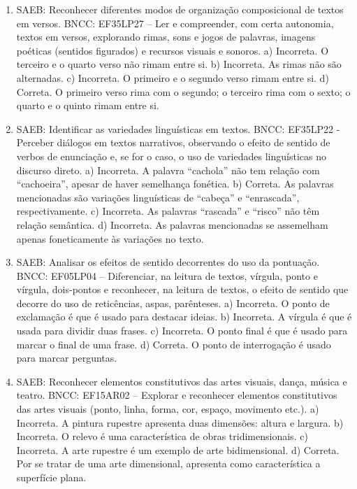\begin{enumerate}
\item
SAEB: Reconhecer diferentes modos de organização composicional de textos em versos.
BNCC: EF35LP27 – Ler e compreender, com certa autonomia,
textos em versos, explorando rimas, sons e jogos de palavras, imagens
poéticas (sentidos figurados) e recursos visuais e sonoros.
a) Incorreta. O terceiro e o quarto verso não rimam entre si.
b) Incorreta. As rimas não são alternadas.
c) Incorreta. O primeiro e o segundo verso rimam entre si.
d) Correta. O primeiro verso rima com o segundo; o terceiro rima com o sexto; o quarto e o quinto rimam entre si.

\item
SAEB: Identificar as variedades linguísticas em textos. BNCC: EF35LP22
- Perceber diálogos em textos narrativos, observando o efeito de sentido
de verbos de enunciação e, se for o caso, o uso de variedades
linguísticas no discurso direto.
a) Incorreta. A palavra “cachola” não tem relação com “cachoeira”, apesar de haver semelhança fonética.
b) Correta. As palavras mencionadas são variações linguísticas de “cabeça” e “enrascada”, respectivamente.
c) Incorreta. As palavras “rascada” e “risco” não têm relação semântica.
d) Incorreta. As palavras mencionadas se assemelham apenas foneticamente às variações no texto.

\item
SAEB: Analisar os efeitos de sentido decorrentes do uso da pontuação.
BNCC: EF05LP04 – Diferenciar, na leitura de textos, vírgula, ponto e
vírgula, dois-pontos e reconhecer, na leitura de textos, o efeito de
sentido que decorre do uso de reticências, aspas, parênteses.
a) Incorreta. O ponto de exclamação é que é usado para destacar ideias.
b) Incorreta. A vírgula é que é usada para dividir duas frases.
c) Incorreta. O ponto final é que é usado para marcar o final de uma frase.
d) Correta. O ponto de interrogação é usado para marcar perguntas.

\item
SAEB: Reconhecer elementos constitutivos das artes visuais, dança,
música e teatro.
BNCC: EF15AR02 – Explorar e reconhecer elementos constitutivos das artes
visuais (ponto, linha, forma, cor, espaço, movimento etc.).
a)  Incorreta. A pintura rupestre apresenta duas dimensões: altura e largura.
b)  Incorreta. O relevo é uma característica de obras tridimensionais.
c)  Incorreta. A arte rupestre é um exemplo de arte bidimensional.
d)  Correta. Por se tratar de uma arte dimensional, apresenta como
  característica a superfície plana.


\end{enumerate}
